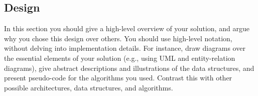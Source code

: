 \subsection{Design}

\label{sec:design}

In this section you should give a high-level overview of your
solution, and argue why you chose this design over others. You should
use high-level notation, without delving into implementation details.
For instance, draw diagrams over the essential elements of your
solution (e.g., using UML and entity-relation diagrams), give abstract
descriptions and illustrations of the data structures, and present
pseudo-code for the algorithms you used. Contrast this with other
possible architectures, data structures, and algorithms.
